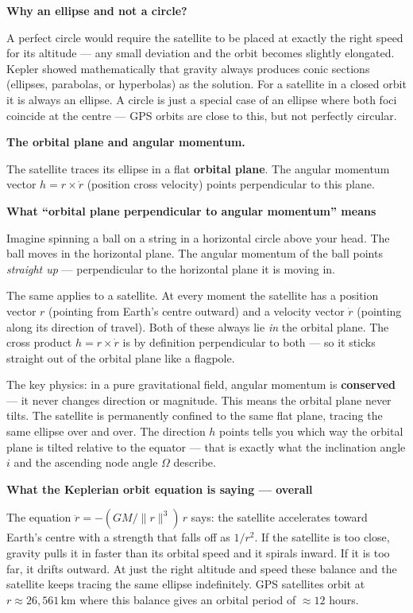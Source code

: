 \documentclass[12pt, a4paper]{article}
\begin{document}
\begin{notebox}
  \textbf{Why an ellipse and not a circle?}

  A perfect circle would require the satellite to be placed at exactly
  the right speed for its altitude --- any small deviation and the
  orbit becomes slightly elongated.
  Kepler showed mathematically that gravity always produces conic
  sections (ellipses, parabolas, or hyperbolas) as the solution.
  For a satellite in a closed orbit it is always an ellipse.
  A circle is just a special case of an ellipse where both foci
  coincide at the centre --- GPS orbits are close to this, but not
  perfectly circular.
\end{notebox}

\textbf{The orbital plane and angular momentum.}

The satellite traces its ellipse in a flat \textbf{orbital plane}.
The angular momentum vector $h = r \times \dot{r}$ (position cross
velocity) points perpendicular to this plane.

\begin{notebox}
  \textbf{What ``orbital plane perpendicular to angular momentum''
  means}

  Imagine spinning a ball on a string in a horizontal circle above
  your head.
  The ball moves in the horizontal plane.
  The angular momentum of the ball points \emph{straight up} ---
  perpendicular to the horizontal plane it is moving in.

  The same applies to a satellite.
  At every moment the satellite has a position vector $r$ (pointing
  from Earth's centre outward) and a velocity vector $\dot{r}$
  (pointing along its direction of travel).
  Both of these always lie \emph{in} the orbital plane.
  The cross product $h = r \times \dot{r}$ is by definition
  perpendicular to both --- so it sticks straight out of the orbital
  plane like a flagpole.

  The key physics: in a pure gravitational field, angular momentum
  is \textbf{conserved} --- it never changes direction or magnitude.
  This means the orbital plane never tilts.
  The satellite is permanently confined to the same flat plane,
  tracing the same ellipse over and over.
  The direction $h$ points tells you which way the orbital plane is
  tilted relative to the equator --- that is exactly what the
  inclination angle $i$ and the ascending node angle $\Omega$
  describe.
\end{notebox}

\begin{notebox}
  \textbf{What the Keplerian orbit equation is saying --- overall}

  The equation $\ddot{r} = -(GM/\|r\|^3)\,r$ says: the satellite
  accelerates toward Earth's centre with a strength that falls off
  as $1/r^2$.
  If the satellite is too close, gravity pulls it in faster than its
  orbital speed and it spirals inward.
  If it is too far, it drifts outward.
  At just the right altitude and speed these balance and the satellite
  keeps tracing the same ellipse indefinitely.
  GPS satellites orbit at $r \approx 26{,}561$\,km where this balance
  gives an orbital period of $\approx 12$ hours.
\end{notebox}
\end{document}
